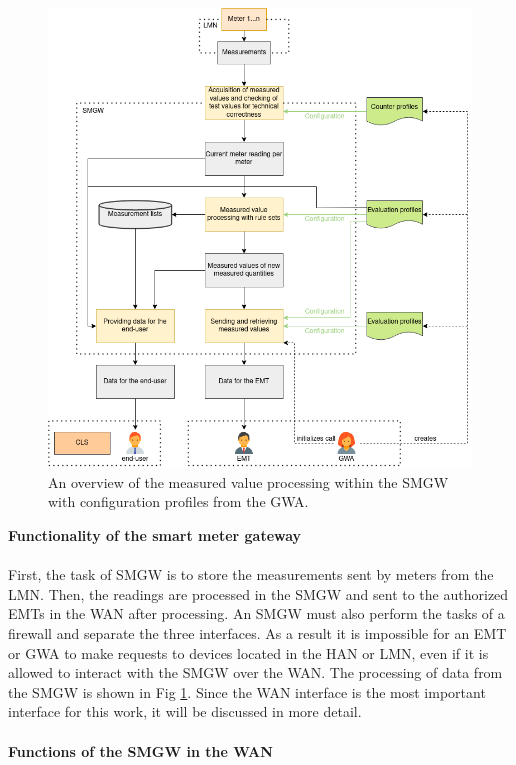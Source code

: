 \begin{figure}[tbp]
  \centering
  \includegraphics[width=1\textwidth]{images/MessverarbeitungEnglish.png}
  \caption[Measured Value Processing in a SMGW]{An overview of the measured value processing within the SMGW with configuration profiles from the GWA.}
  \label{fig:value_processing}
\end{figure}
\textbf{Functionality of the smart meter gateway}
\\
\\
First, the task of SMGW is to store the measurements sent by meters from the LMN. Then, the readings are processed in the SMGW and sent to the authorized EMTs in the WAN after processing. An SMGW must also perform the tasks of a firewall and separate the three interfaces. As a result it is impossible for an EMT or GWA to make requests to devices located in the HAN or LMN, even if it is allowed to interact with the SMGW over the WAN. The processing of data from the SMGW is shown in Fig \ref{fig:value_processing}. Since the WAN interface is the most important interface for this work, it will be discussed in more detail.\\
\\
\textbf{Functions of the SMGW in the WAN}
\\
